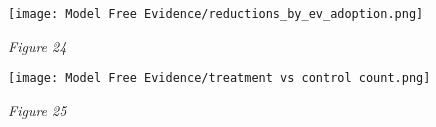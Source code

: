 \documentclass[12pt]{article}
\newenvironment{Figure}
{\par\medskip\noindent\minipage{\linewidth}}
{\endminipage\par\medskip}
\begin{document}
	\begin{Figure}
		\centering
		\texttt{[image: Model Free Evidence/reductions\_by\_ev\_adoption.png]}
		
	\end{Figure}
	\begin{center}
		\emph{Figure 24}\\
	\end{center}
	
	\begin{Figure}
		\centering
		\texttt{[image: Model Free Evidence/treatment vs control count.png]}
		
	\end{Figure}
	\begin{center}
		\emph{Figure 25}\\
	\end{center}
	
	
	
	\newpage
	\pagebreak
	\newpage
	\newpage
	
	
	
\end{document}
